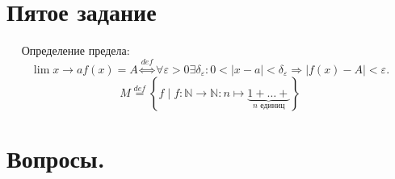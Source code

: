 \documentclass[a4paper,12pt]{article} %
\begin{document}
	\section{Пятое задание}
	$\quad$ Определение предела:
	$$
		\lim \limits{x \to a} f(x) = A \stackrel{def}{\Longleftrightarrow}
		\forall \varepsilon > 0 \exists \delta_{\varepsilon} : 
		0 < |x - a| < \delta_{\varepsilon} \Longrightarrow 
		| f(x) - A | < \varepsilon.
	$$
	$$
		M \stackrel{def}{=} \left\{ f \mid f : \mathbb{N} \to \mathbb{N} : n \longmapsto \underbrace{1 + \dots + }_{n \text{ единиц}} \right\}
	$$
	
	
	\newpage
	\section{Вопросы.}
\end{document}
